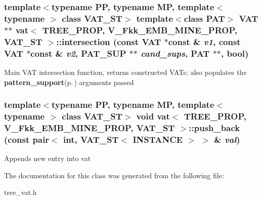 \subsubsection{\setlength{\rightskip}{0pt plus 5cm}template$<$typename PP, typename MP, template$<$ typename $>$ class VAT\_\-ST$>$ template$<$class PAT$>$ {\bf VAT}$\ast$$\ast$ {\bf vat}$<$ TREE\_\-PROP, V\_\-Fkk\_\-EMB\_\-MINE\_\-PROP, VAT\_\-ST $>$::intersection (const {\bf VAT} $\ast$const \& {\em v1}, const {\bf VAT} $\ast$const \& {\em v2}, {\bf PAT\_\-SUP} $\ast$$\ast$ {\em cand\_\-sups}, PAT $\ast$$\ast$, bool)\hspace{0.3cm}{\tt  [inline, static]}}\label{classvat_3_01TREE__PROP_00_01V__Fkk__EMB__MINE__PROP_00_01VAT__ST_01_4_e0}


Main VAT intersection function, returns constructed VATs; also populates the {\bf pattern\_\-support}{\rm (p.\,\pageref{classpattern__support})} arguments passed 
\subsubsection{\setlength{\rightskip}{0pt plus 5cm}template$<$typename PP, typename MP, template$<$ typename $>$ class VAT\_\-ST$>$ void {\bf vat}$<$ TREE\_\-PROP, V\_\-Fkk\_\-EMB\_\-MINE\_\-PROP, VAT\_\-ST $>$::push\_\-back (const pair$<$ int, VAT\_\-ST$<$ {\bf INSTANCE} $>$ $>$ \& {\em val})\hspace{0.3cm}{\tt  [inline]}}\label{classvat_3_01TREE__PROP_00_01V__Fkk__EMB__MINE__PROP_00_01VAT__ST_01_4_a6}


Appends new entry into vat 

The documentation for this class was generated from the following file:\begin{CompactItemize}
\item 
tree\_\-vat.h\end{CompactItemize}
